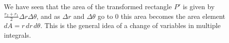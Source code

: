 \begin{activitySolution}
\begin{center}
\end{center}
We have seen that the area of the transformed rectangle $P'$ is given by $\frac{r_2+r_1}{2} \Delta r \Delta \theta$, and as $\Delta r$ and $\Delta \theta$ go to 0 this area becomes the area element $dA = r \, dr \, d\theta$. This is the general idea of a change of variables in multiple integrals.

	\ea
	
\end{activitySolution}

 \afterpa 